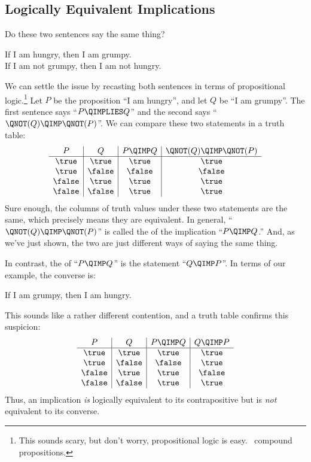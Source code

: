 \subsection{Logically Equivalent Implications}\label{sec:logical_equivalence}

Do these two sentences say the same thing?
%
\begin{center}
If I am hungry, then I am grumpy. \\
If I am not grumpy, then I am not hungry.
\end{center}
%
We can settle the issue by recasting both sentences in terms of
propositional logic.\footnote{This sounds scary, but don't worry,
  propositional logic is easy.  \illegible\ compound propositions.}
Let $P$ be the proposition ``I am hungry'', and let $Q$ be ``I am
grumpy''.  The first sentence says ``$P \QIMPLIES Q$'' and the second
says ``$\QNOT(Q) \QIMP \QNOT(P)$''.  We can compare these two
statements in a truth table:
%
\[
\begin{array}{c|c|c|c}
P & Q &
    P \QIMP Q &
    \QNOT(Q) \QIMP \QNOT(P) \\ \hline
\true & \true & \true & \true \\
\true & \false & \false & \false \\
\false & \true & \true & \true \\
\false & \false & \true & \true
\end{array}
\]
%
Sure enough, the columns of truth values under these two statements are
the same, which precisely means they are equivalent.  In general,
``$\QNOT(Q) \QIMP \QNOT(P)$'' is called the  of
the implication ``$P \QIMP Q$.''  And, as we've just shown, the two
are just different ways of saying the same thing.

In contrast, the  of ``$P \QIMP Q$'' is the statement
``$Q \QIMP P$''.  In terms of our example, the converse is:
%
\begin{center}
If I am grumpy, then I am hungry.
\end{center}
%
This sounds like a rather different contention, and a truth table
confirms this suspicion:
%
\[
\begin{array}{c|c|c|c}
P & Q &
    P \QIMP Q &
    Q \QIMP P \\ \hline
\true & \true & \true & \true \\
\true & \false & \false & \true \\
\false & \true & \true & \false \\
\false & \false & \true & \true
\end{array}
\]
%
Thus, an implication \textit{is} logically equivalent to its
contrapositive but is \textit{not} equivalent to its converse.

